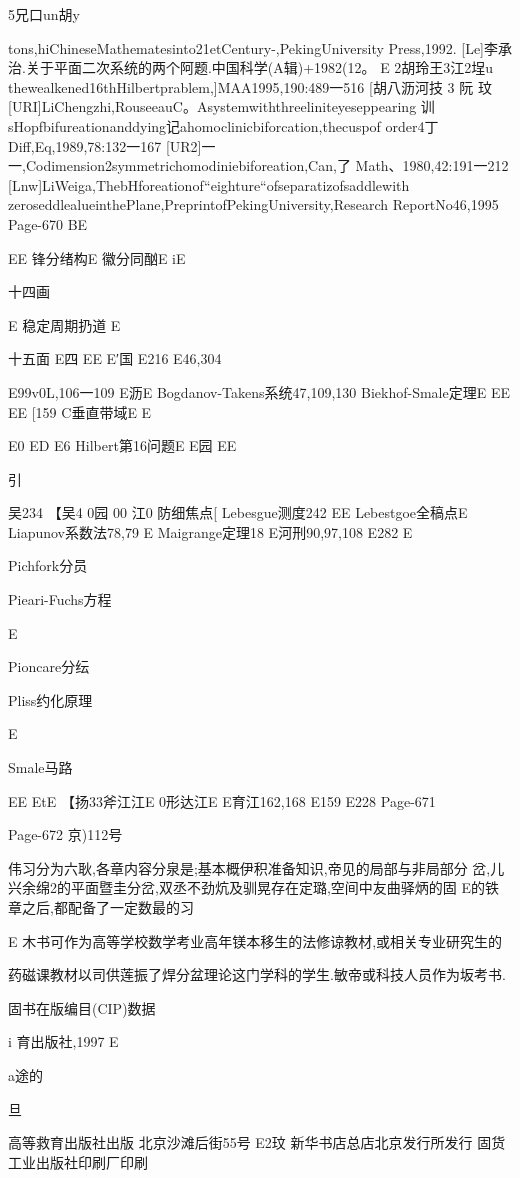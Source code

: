 5兄口un胡y

tons,hiChineseMathematesinto21etCentury-,PekingUniversity
Press,1992.
[Le]李承治.关于平面二次系统的两个阿题.中国科学(A辑)+1982(12。
E
2胡玲王3江2埕u
thewealkened16thHilbertprablem,]MAA1995,190:489一516
[胡八沥河技
3
阮
玟
[URI]LiChengzhi,RouseeauC。Asystemwiththreeliniteyeseppearing
训sHopfbifureationanddying记ahomoclinicbiforcation,thecuspof
order4丁Diff,Eq,1989,78:132一167
[UR2]一一,Codimension2symmetrichomodiniebiforeation,Can,了
Math、1980,42:191一212
[Lnw]LiWeiga,ThebHforeationof“eighture“ofseparatizofsaddlewith
zeroseddlealueinthePlane,PreprintofPekingUniversity,Research
ReportNo46,1995
Page-670
BE

EE
锋分绪构E
徽分同酗E
iE

十四画

E
稳定周期扔道
E

十五面
E四
EE
E′国
E216
E46,304

E99v0L,106一109
E沥E
Bogdanov-Takens系统47,109,130
Biekhof-Smale定理E
EE
EE
[159
C垂直带域E
E

E0
ED
E6
Hilbert第16问题E
E园
EE

引

吴234
【吴4
0园
00
江0
防细焦点[
Lebesgue测度242
EE
Lebestgoe全稿点E
Liapunov系数法78,79
E
Maigrange定理18
E河刑90,97,108
E282
E

Pichfork分员

Pieari-Fuchs方程

E

Pioncare分纭

Pliss约化原理

E

Smale马路

EE
EtE
【扬33斧江江E
0形达江E
E育江162,168
E159
E228
Page-671

Page-672
京)112号

伟习分为六耿,各章内容分泉是;基本概伊积准备知识,帝见的局部与非局部分
岔,儿兴余绵2的平面暨圭分岔,双丞不劲炕及驯晃存在定璐,空间中友曲驿炳的固
E的铁章之后,都配备了一定数最的习

E
木书可作为高等学校数学考业高年镁本移生的法修谅教材,或相关专业研究生的

药磁课教材以司供莲振了焊分盆理论这门学科的学生.敏帝或科技人员作为坂考书.

固书在版编目(CIP)数据

i
育出版社,1997
E

a途的

旦

高等救育出版社出版
北京沙滩后街55号
E2玟
新华书店总店北京发行所发行
固货工业出版社印刷厂印刷

